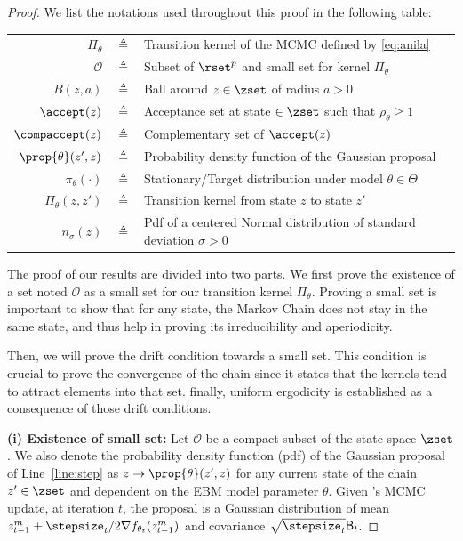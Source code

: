\documentclass[10pt,twocolumn,letterpaper]{article}
\begin{document}
\begin{proof}



We list the notations used throughout this proof in the following table:

\begin{table}[htbp]
\begin{tabular}{r c p{17cm} }
\toprule
$\Pi_\theta$ & $\triangleq$ &  Transition kernel of the MCMC defined by \eqref{eq:anila}\\
$\mathcal{O}$ & $\triangleq$ & Subset of $\rset^p$ and small set for kernel $\Pi_\theta$\\
$B(z,a)$  & $\triangleq$ & Ball around $z \in \zset$ of radius $a >0$\\
$\accept(z)$ & $\triangleq$ & Acceptance set at state $ \in \zset$ such that $\rho_\theta \geq 1$ \\
$\compaccept(z)$ & $\triangleq$ & Complementary set of  $\accept(z)$\\
$\prop{\theta}(z',z)$ & $\triangleq$ &  Probability density function of the Gaussian proposal\\
$\pi_{\theta}(\cdot)$ & $\triangleq$ &  Stationary/Target distribution under model $\theta \in \Theta$\\
$\Pi_\theta(z, z')$ & $\triangleq$ & Transition kernel from state $z$ to state $z'$\\
$n_{\sigma}(z)$ & $\triangleq$ & Pdf of a centered Normal distribution of standard deviation $\sigma >0$ \\
\bottomrule
\end{tabular}
\label{tab:notations}
\end{table}

The proof of our results are divided into two parts.
We first prove the existence of a set noted $\mathcal{O}$ as a small set for our transition kernel $\Pi_\theta$.
Proving a small set is important to show that for any state, the Markov Chain does not stay in the same state, and thus help in proving its irreducibility and aperiodicity.

Then, we will prove the drift condition towards a small set.
This condition is crucial to prove the convergence of the chain since it states that the kernels tend to attract elements into that set. 
finally, uniform ergodicity is established as a consequence of those drift conditions.

\medskip
\noindent \textbf{(i) Existence of small set: }
Let $\mathcal{O}$ be a compact subset of the state space $\zset$.
We also denote the probability density function (pdf) of the Gaussian proposal of Line~\ref{line:step} as $z \to \prop{\theta}(z',z)$ for any current state of the chain $z' \in \zset$ and dependent on the EBM model parameter $\theta$.
Given \algo's MCMC update, at iteration $t$, the proposal is a Gaussian distribution of mean $z_{t-1}^m+ \stepsize_t/2  \nabla f_{\theta_t}(z_{t-1}^m)$ and covariance $\sqrt{\stepsize_t} \mathsf{B}_t$.


\end{proof}
\end{document}
